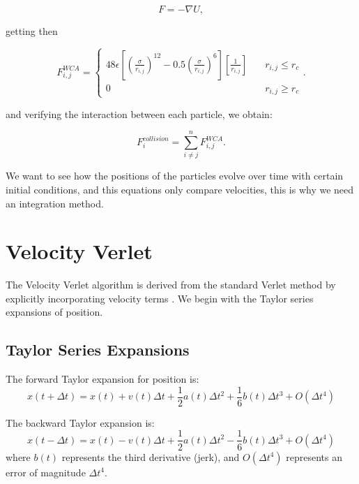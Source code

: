 \begin{equation}
 F = - \nabla U, 
  \label{eq:negativegradient}
\end{equation}

getting then

\begin{equation}
  F_{i,j}^{WCA} = \begin{cases} 
    48\epsilon\left[ \left( \frac{\sigma}{r_{i,j}}\right)^{12} - 0.5\left( \frac{\sigma}{r_{i,j}}\right)^6\right]\left[ \frac{1}{r_{i,j}}\right] \quad &r_{i,j} \leq r_c \\
    0 \quad & r_{i,j} \geq r_c
  \end{cases}.
  \label{eq:wcaforce}
\end{equation}

and verifying the interaction between each particle, we obtain:

\begin{equation}
  F^{collision}_i = \sum^{n}_{i \neq j} F^{WCA}_{i,j}.  
  \label{eq:wcasum}
\end{equation}

We want to see how the positions of the particles evolve over time with certain initial conditions, and this equations only compare velocities, this is why we need an integration method.

\section{Velocity Verlet}

The Velocity Verlet algorithm is derived from the standard Verlet method by explicitly incorporating velocity terms \cite{verlet1967computer, chambliss2020magnetic}. We begin with the Taylor series expansions of position.

\subsection{Taylor Series Expansions}

The forward Taylor expansion for position is:
\begin{equation}
    x(t+\Delta t) = x(t) + v(t)\Delta t + \frac{1}{2}a(t)\Delta t^2 + \frac{1}{6}b(t)\Delta t^3 + O(\Delta t^4)
    \label{eq:taylor_forward}
\end{equation}

The backward Taylor expansion is:
\begin{equation}
    x(t-\Delta t) = x(t) - v(t)\Delta t + \frac{1}{2}a(t)\Delta t^2 - \frac{1}{6}b(t)\Delta t^3 + O(\Delta t^4)
    \label{eq:taylor_backward}
\end{equation}
where $b(t)$ represents the third derivative (jerk), and $O(\Delta t^4)$ represents an error of magnitude $\Delta t^4$.

